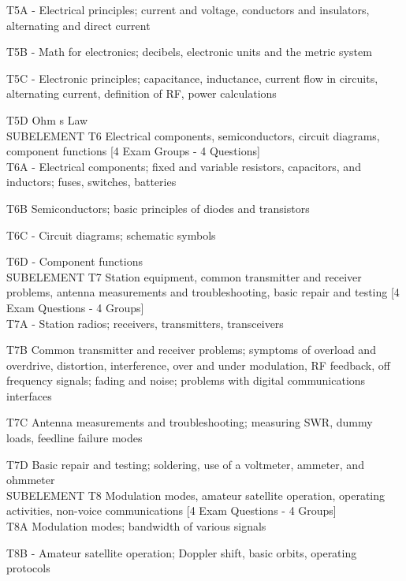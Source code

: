 \documentclass[12pt,letterpaper]{report}
\begin{document}
T5A - Electrical principles; current and voltage, conductors and insulators, alternating and direct current

T5B - Math for electronics; decibels, electronic units and the metric system

T5C - Electronic principles; capacitance, inductance, current flow in circuits, alternating current, definition of RF, power calculations

T5D   Ohm s Law\\


SUBELEMENT T6   Electrical components, semiconductors, circuit diagrams, component functions   [4 Exam Groups - 4 Questions]\\

T6A - Electrical components; fixed and variable resistors, capacitors, and inductors; fuses, switches, batteries

T6B   Semiconductors; basic principles of diodes and transistors

T6C - Circuit diagrams; schematic symbols

T6D - Component functions\\


SUBELEMENT T7   Station equipment, common transmitter and receiver problems, antenna measurements and troubleshooting, basic repair and testing   [4 Exam Questions - 4 Groups]\\

T7A - Station radios; receivers, transmitters, transceivers

T7B   Common transmitter and receiver problems; symptoms of overload and overdrive, distortion, interference, over and under modulation, RF feedback, off frequency signals; fading and noise; problems with digital communications interfaces

T7C   Antenna measurements and troubleshooting; measuring SWR, dummy loads, feedline failure modes

T7D   Basic repair and testing; soldering, use of a voltmeter, ammeter, and ohmmeter\\



SUBELEMENT T8   Modulation modes, amateur satellite operation, operating activities, non-voice communications   [4 Exam Questions - 4 Groups]\\

T8A   Modulation modes; bandwidth of various signals

T8B - Amateur satellite operation; Doppler shift, basic orbits, operating protocols
\end{document}
